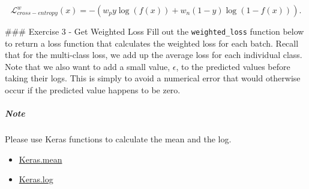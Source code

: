 \documentclass[11pt]{article}
\providecommand{\tightlist}{%
      \setlength{\itemsep}{0pt}\setlength{\parskip}{0pt}}
\begin{document}
\[\mathcal{L}_{cross-entropy}^{w}(x) = - (w_{p} y \log(f(x)) + w_{n}(1-y) \log( 1 - f(x) ) ).\]

     \#\#\# Exercise 3 - Get Weighted Loss Fill out the
\texttt{weighted\_loss} function below to return a loss function that
calculates the weighted loss for each batch. Recall that for the
multi-class loss, we add up the average loss for each individual class.
Note that we also want to add a small value, \(\epsilon\), to the
predicted values before taking their logs. This is simply to avoid a
numerical error that would otherwise occur if the predicted value
happens to be zero.

\hypertarget{note}{%
\subparagraph{Note}\label{note}}

Please use Keras functions to calculate the mean and the log.

\begin{itemize}
\tightlist
\item
  \href{https://www.tensorflow.org/versions/r1.15/api_docs/python/tf/keras/backend/mean}{Keras.mean}
\item
  \href{https://www.tensorflow.org/versions/r1.15/api_docs/python/tf/keras/backend/log}{Keras.log}
\end{itemize}
\end{document}
